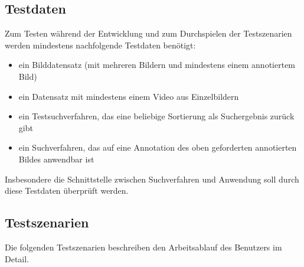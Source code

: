 \subsection{Testdaten}
Zum Testen während der Entwicklung und zum Durchspielen der Testszenarien werden mindestens nachfolgende Testdaten benötigt:
\begin{itemize}
	\item ein Bilddatensatz (mit mehreren Bildern und mindestens einem annotiertem Bild)
	\item ein Datensatz mit mindestens einem Video aus Einzelbildern
	\item ein Testsuchverfahren, das eine beliebige Sortierung als Suchergebnis zurück gibt
	\item ein Suchverfahren, das auf eine Annotation des oben geforderten annotierten Bildes anwendbar ist
\end{itemize}
Insbesondere die Schnittstelle zwischen Suchverfahren und Anwendung soll durch diese Testdaten überprüft werden.

\subsection{Testszenarien}
Die folgenden Testszenarien beschreiben den Arbeitsablauf des Benutzers im Detail.

